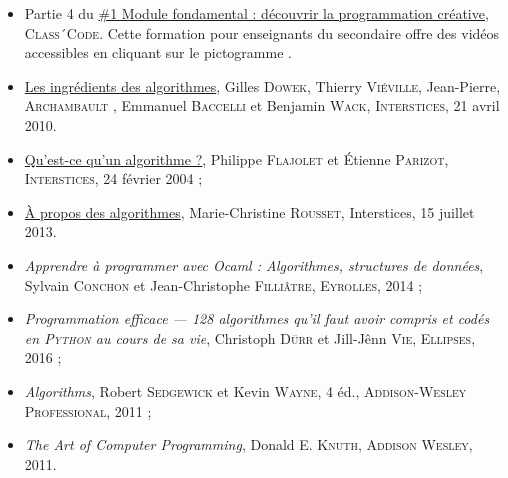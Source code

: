\begin{gofurther}
\begin{itemize}\jazzitem
	\item Partie 4 du \href{https://pixees.fr/classcode/formations/module1/\#partie4}{\#1 Module fondamental : découvrir la programmation créative}, \textsc{Class´Code}. Cette formation pour enseignants du secondaire offre des vidéos accessibles en cliquant sur le pictogramme .
\end{itemize}

\begin{itemize}\jazzitem
\item \href{https://interstices.info/les-ingredients-des-algorithmes/}{Les ingrédients des algorithmes}, Gilles \textsc{Dowek}, Thierry \textsc{Viéville}, Jean-Pierre, \textsc{Archambault} , Emmanuel \textsc{Baccelli} et Benjamin \textsc{Wack}, \textsc{Interstices}, 21 avril 2010.
\item \href{https://interstices.info/quest-ce-quun-algorithme/}{Qu’est-ce qu’un algorithme ?}, Philippe \textsc{Flajolet} et Étienne \textsc{Parizot}, \textsc{Interstices}, 24 février 2004 ;
\end{itemize}

\begin{itemize}\jazzitem
\item \href{https://interstices.info/a-propos-des-algorithmes/}{À propos des algorithmes}, Marie-Christine \textsc{Rousset}, Intersti\-ces, 15 juillet 2013.
\end{itemize}

\begin{itemize}\jazzitem
\item \textit{Apprendre à programmer avec Ocaml : Algorithmes, structures de données}, Sylvain \textsc{Conchon} et Jean-Christophe \textsc{Filliâtre}, \textsc{Eyrolles}, 2014 ;
\item \textit{Programmation efficace --- 128 algorithmes qu’il faut avoir compris et codés en \textsc{Python} au cours de sa vie}, Christoph \textsc{Dürr} et Jill-Jênn \textsc{Vie}, \textsc{Ellipses}, 2016 ;
\item \textit{Algorithms}, Robert \textsc{Sedgewick} et Kevin \textsc{Wayne}, 4 éd., \textsc{Addison-Wesley Professional}, 2011 ;
\item \textit{The Art of Computer Programming}, Donald E. \textsc{Knuth}, \textsc{Addison Wesley}, 2011.
\end{itemize}
\end{gofurther}


